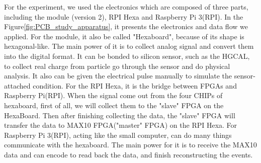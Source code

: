 For the experiment, we used the electronics which are composed of three parts, including the module (version 2), RPI Hexa and Raspberry Pi 3(RPI). In the Figure\ref{fig:PCB_study_apparatus}, it presents the electronics and data flow we applied. For the module, it also be called "Hexaboard", because of its shape is hexagonal-like. The main power of it is to collect analog signal and convert them into the digital format. It can be bonded to silicon sensor, such as the HGCAL, to collect real charge from particle go through the sensor and do physical analysis. It also can be given the electrical pulse manually to simulate the sensor-attached condition. For the RPI Hexa, it is the bridge between FPGAs and Raspberry Pi(RPI). When the signal come out from the four CHIPs of hexaboard, first of all, we will collect them to the "slave" FPGA on the HexaBoard. Then after finishing collecting the data, the "slave" FPGA will transfer the data to MAX10 FPGA("master" FPGA) on the RPI Hexa. For Raspberry Pi 3(RPI), acting like the small computer, can do many things communicate with the hexaboard. The main power for it is to receive the MAX10 data and can encode to read back the data, and finish reconstructing the events.

